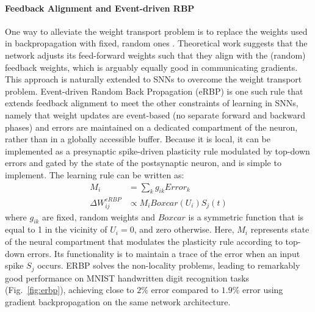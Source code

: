 \documentclass[english]{article}
\newcommand{\reffig}[1]{{Fig.~\ref{#1}}}
\renewcommand{\cite}{\citep}
\begin{document}
\paragraph{Feedback Alignment and Event-driven RBP}
One way to alleviate the weight transport problem is to replace the weights used in backpropagation with fixed, random ones \cite{Lillicrap_etal16_randsyna}.
Theoretical work suggests that the network adjusts its feed-forward weights such that they align with the (random) feedback weights, which is arguably equally good in communicating gradients.
This approach is naturally extended to \acp{SNN} to overcome the weight transport problem. Event-driven Random Back Propagation (eRBP) is one such rule that extends feedback alignment to meet the other constraints of learning in \acp{SNN}, namely that weight updates are event-based (no separate forward and backward phases) and errors are maintained on a dedicated compartment of the neuron, rather than in a globally accessible buffer. Because it is local, it can be implemented as a presynaptic spike-driven plasticity rule modulated by top-down errors and gated by the state of the postsynaptic neuron, and is simple to implement. The learning rule can be written as:
\begin{equation}\label{eq:erbp_rule}
\begin{split}
M_i &= \sum_k g_{ik} Error_k\\
\Delta W_{ij}^{eRBP} &\propto  M_i Boxcar(U_i) S_j(t)
\end{split}
\end{equation}
where $g_{ik}$ are fixed, random weights and $Boxcar$ is a symmetric function that is equal to 1 in the vicinity of $U_i=0$, and zero otherwise. 
Here, $M_i$ represents state of the neural compartment that modulates the plasticity rule according to top-down errors. 
Its functionality is to maintain a trace of the error when an input spike $S_j$ occurs.
ERBP solves the non-locality problems, leading to remarkably good performance on MNIST handwritten digit recognition tasks (\reffig{fig:erbp}), achieving close to $2\%$ error compared to $1.9\%$ error using gradient backpropagation on the same network architecture.
%
\end{document}
